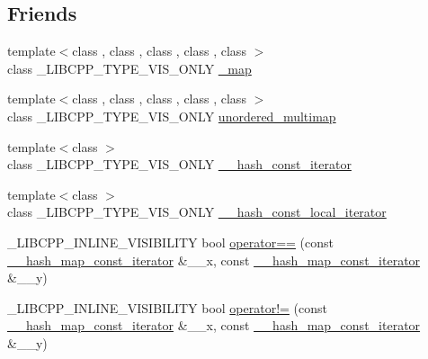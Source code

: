 \subsection*{Friends}
\begin{DoxyCompactItemize}
\item 
{\footnotesize template$<$class , class , class , class , class $>$ }\\class \+\_\+\+L\+I\+B\+C\+P\+P\+\_\+\+T\+Y\+P\+E\+\_\+\+V\+I\+S\+\_\+\+O\+N\+L\+Y \hyperlink{class____hash__map__const__iterator_aae80f6d0694700b968ad65123b05bb8d}{\+\_\+map}
\item 
{\footnotesize template$<$class , class , class , class , class $>$ }\\class \+\_\+\+L\+I\+B\+C\+P\+P\+\_\+\+T\+Y\+P\+E\+\_\+\+V\+I\+S\+\_\+\+O\+N\+L\+Y \hyperlink{class____hash__map__const__iterator_a10e575a91277f87c87f667fc1d2672eb}{unordered\+\_\+multimap}
\item 
{\footnotesize template$<$class $>$ }\\class \+\_\+\+L\+I\+B\+C\+P\+P\+\_\+\+T\+Y\+P\+E\+\_\+\+V\+I\+S\+\_\+\+O\+N\+L\+Y \hyperlink{class____hash__map__const__iterator_aa83445397abeb5cadc338a3b84306aa3}{\+\_\+\+\_\+hash\+\_\+const\+\_\+iterator}
\item 
{\footnotesize template$<$class $>$ }\\class \+\_\+\+L\+I\+B\+C\+P\+P\+\_\+\+T\+Y\+P\+E\+\_\+\+V\+I\+S\+\_\+\+O\+N\+L\+Y \hyperlink{class____hash__map__const__iterator_a7f9b280728e4a73bb8c94808def95e7f}{\+\_\+\+\_\+hash\+\_\+const\+\_\+local\+\_\+iterator}
\item 
\+\_\+\+L\+I\+B\+C\+P\+P\+\_\+\+I\+N\+L\+I\+N\+E\+\_\+\+V\+I\+S\+I\+B\+I\+L\+I\+T\+Y bool \hyperlink{class____hash__map__const__iterator_ac410df59b0d1c7793a6eb6db1b8e044e}{operator==} (const \hyperlink{class____hash__map__const__iterator}{\+\_\+\+\_\+hash\+\_\+map\+\_\+const\+\_\+iterator} \&\+\_\+\+\_\+x, const \hyperlink{class____hash__map__const__iterator}{\+\_\+\+\_\+hash\+\_\+map\+\_\+const\+\_\+iterator} \&\+\_\+\+\_\+y)
\item 
\+\_\+\+L\+I\+B\+C\+P\+P\+\_\+\+I\+N\+L\+I\+N\+E\+\_\+\+V\+I\+S\+I\+B\+I\+L\+I\+T\+Y bool \hyperlink{class____hash__map__const__iterator_a28b0a851d8dca47ffcdd8f936ba9d780}{operator!=} (const \hyperlink{class____hash__map__const__iterator}{\+\_\+\+\_\+hash\+\_\+map\+\_\+const\+\_\+iterator} \&\+\_\+\+\_\+x, const \hyperlink{class____hash__map__const__iterator}{\+\_\+\+\_\+hash\+\_\+map\+\_\+const\+\_\+iterator} \&\+\_\+\+\_\+y)
\item 

\end{DoxyCompactItemize}
